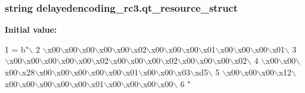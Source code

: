 \subsubsection[{qt\+\_\+resource\+\_\+struct}]{\setlength{\rightskip}{0pt plus 5cm}string delayedencoding\+\_\+rc3.\+qt\+\_\+resource\+\_\+struct}\label{namespacedelayedencoding__rc3_ac14be1465c69d6025a39f1b855f90fa9}
{\bfseries Initial value\+:}
\begin{DoxyCode}
1 = b\textcolor{stringliteral}{"\(\backslash\)}
2 \textcolor{stringliteral}{\(\backslash\)x00\(\backslash\)x00\(\backslash\)x00\(\backslash\)x00\(\backslash\)x00\(\backslash\)x02\(\backslash\)x00\(\backslash\)x00\(\backslash\)x00\(\backslash\)x01\(\backslash\)x00\(\backslash\)x00\(\backslash\)x00\(\backslash\)x01\(\backslash\)}
3 \textcolor{stringliteral}{\(\backslash\)x00\(\backslash\)x00\(\backslash\)x00\(\backslash\)x00\(\backslash\)x00\(\backslash\)x02\(\backslash\)x00\(\backslash\)x00\(\backslash\)x00\(\backslash\)x02\(\backslash\)x00\(\backslash\)x00\(\backslash\)x00\(\backslash\)x02\(\backslash\)}
4 \textcolor{stringliteral}{\(\backslash\)x00\(\backslash\)x00\(\backslash\)x00\(\backslash\)x28\(\backslash\)x00\(\backslash\)x00\(\backslash\)x00\(\backslash\)x00\(\backslash\)x00\(\backslash\)x01\(\backslash\)x00\(\backslash\)x00\(\backslash\)x03\(\backslash\)xd5\(\backslash\)}
5 \textcolor{stringliteral}{\(\backslash\)x00\(\backslash\)x00\(\backslash\)x00\(\backslash\)x12\(\backslash\)x00\(\backslash\)x00\(\backslash\)x00\(\backslash\)x00\(\backslash\)x00\(\backslash\)x01\(\backslash\)x00\(\backslash\)x00\(\backslash\)x00\(\backslash\)x00\(\backslash\)}
6 \textcolor{stringliteral}{"}
\end{DoxyCode}

